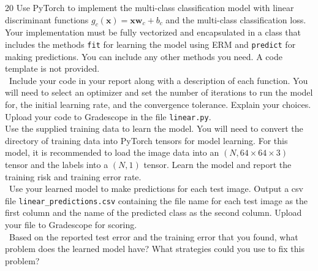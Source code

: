 \documentclass[11pt]{article}
\newcommand{\mbf}[1]{{\mathbf{#1}}}
\begin{document}
\begin{problem}{20} Use PyTorch to implement the multi-class classification model with linear discriminant functions 
    $g_c(\mbf{x})= \mbf{x}\mbf{w}_c + b_c$ and the multi-class classification loss. Your implementation must be fully vectorized and encapsulated in a class that includes the methods \verb|fit| for learning the model using ERM and \verb|predict| for making predictions. You can include any other methods you need. A code template is not provided.\\
    
    ~Include your code in your report along with a description of each function. You will need to select an optimizer and set the number of iterations to run the model for, the initial learning rate, and the convergence tolerance. Explain your choices. Upload your code to Gradescope in the file \verb|linear.py|.\\

    Use the supplied training data to learn the model. You will need to convert the directory of training data into PyTorch tensors for model learning. For this model, it is recommended to load the image data into an $(N,64\times 64\times 3)$ tensor and the labels into a $(N,1)$ tensor. Learn the model and report the training risk and training error rate.\\

    ~Use your learned model to make predictions for each test image.
   Output a csv file \verb|linear_predictions.csv| containing the file name for each test image as the first column and the name of the predicted class as the second column. Upload your file to Gradescope for scoring.\\

    ~Based on the reported test error and the training error that you found, what problem does the learned model have? What strategies could you use to fix this problem?

\end{problem}
\end{document}
